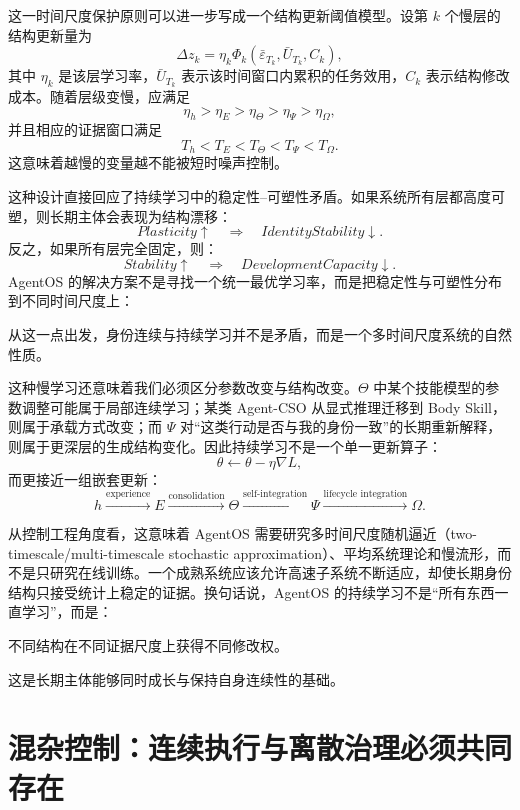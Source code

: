 这一时间尺度保护原则可以进一步写成一个结构更新阈值模型。设第 $k$ 个慢层的结构更新量为
\[
\Delta z_k
=
\eta_k
\Phi_k
\left(
\bar{\varepsilon}_{T_k},
\bar{U}_{T_k},
C_k
\right),
\]
其中 $\eta_k$ 是该层学习率，$\bar{U}_{T_k}$ 表示该时间窗口内累积的任务效用，$C_k$ 表示结构修改成本。随着层级变慢，应满足
\[
\eta_h
>
\eta_E
>
\eta_\Theta
>
\eta_\Psi
>
\eta_\Omega,
\]
并且相应的证据窗口满足
\[
T_h
<
T_E
<
T_\Theta
<
T_\Psi
<
T_\Omega.
\]
这意味着越慢的变量越不能被短时噪声控制。

这种设计直接回应了持续学习中的稳定性--可塑性矛盾。如果系统所有层都高度可塑，则长期主体会表现为结构漂移：
\[
Plasticity\uparrow
\quad\Rightarrow\quad
IdentityStability\downarrow.
\]
反之，如果所有层完全固定，则：
\[
Stability\uparrow
\quad\Rightarrow\quad
DevelopmentCapacity\downarrow.
\]
AgentOS 的解决方案不是寻找一个统一最优学习率，而是把稳定性与可塑性分布到不同时间尺度上：
\begin{statementbox}
\centering
{}
\end{statementbox}
从这一点出发，身份连续与持续学习并不是矛盾，而是一个多时间尺度系统的自然性质。

这种慢学习还意味着我们必须区分参数改变与结构改变。$\Theta$ 中某个技能模型的参数调整可能属于局部连续学习；某类 Agent-CSO 从显式推理迁移到 Body Skill，则属于承载方式改变；而 $\Psi$ 对``这类行动是否与我的身份一致''的长期重新解释，则属于更深层的生成结构变化。因此持续学习不是一个单一更新算子：
\[
\theta\leftarrow\theta-\eta\nabla L,
\]
而更接近一组嵌套更新：
\[
h
\xrightarrow{\text{experience}}
E
\xrightarrow{\text{consolidation}}
\Theta
\xrightarrow{\text{self-integration}}
\Psi
\xrightarrow{\text{lifecycle integration}}
\Omega.
\]

从控制工程角度看，这意味着 AgentOS 需要研究多时间尺度随机逼近（two-timescale/multi-timescale stochastic approximation）、平均系统理论和慢流形，而不是只研究在线训练。一个成熟系统应该允许高速子系统不断适应，却使长期身份结构只接受统计上稳定的证据。换句话说，AgentOS 的持续学习不是``所有东西一直学习''，而是：
\begin{statementbox}
不同结构在不同证据尺度上获得不同修改权。
\end{statementbox}
这是长期主体能够同时成长与保持自身连续性的基础。

\section{混杂控制：连续执行与离散治理必须共同存在}

